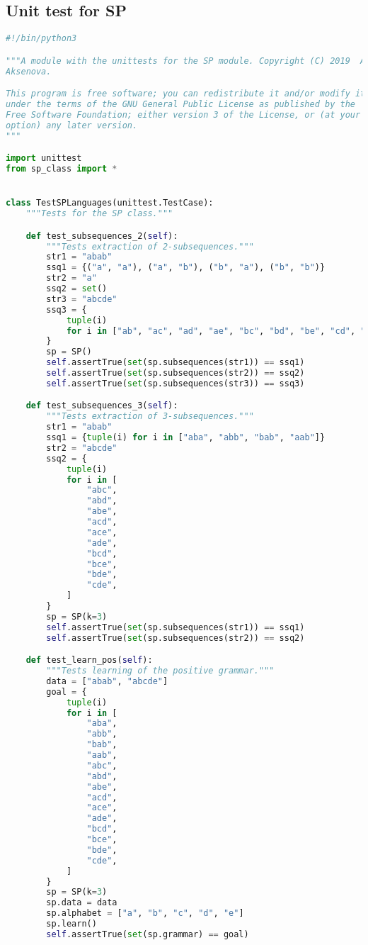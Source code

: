 \subsection*{Unit test for SP}

\begin{lstlisting}[language=Python]
#!/bin/python3

"""A module with the unittests for the SP module. Copyright (C) 2019  Alena
Aksenova.

This program is free software; you can redistribute it and/or modify it
under the terms of the GNU General Public License as published by the
Free Software Foundation; either version 3 of the License, or (at your
option) any later version.
"""

import unittest
from sp_class import *


class TestSPLanguages(unittest.TestCase):
    """Tests for the SP class."""

    def test_subsequences_2(self):
        """Tests extraction of 2-subsequences."""
        str1 = "abab"
        ssq1 = {("a", "a"), ("a", "b"), ("b", "a"), ("b", "b")}
        str2 = "a"
        ssq2 = set()
        str3 = "abcde"
        ssq3 = {
            tuple(i)
            for i in ["ab", "ac", "ad", "ae", "bc", "bd", "be", "cd", "ce", "de"]
        }
        sp = SP()
        self.assertTrue(set(sp.subsequences(str1)) == ssq1)
        self.assertTrue(set(sp.subsequences(str2)) == ssq2)
        self.assertTrue(set(sp.subsequences(str3)) == ssq3)

    def test_subsequences_3(self):
        """Tests extraction of 3-subsequences."""
        str1 = "abab"
        ssq1 = {tuple(i) for i in ["aba", "abb", "bab", "aab"]}
        str2 = "abcde"
        ssq2 = {
            tuple(i)
            for i in [
                "abc",
                "abd",
                "abe",
                "acd",
                "ace",
                "ade",
                "bcd",
                "bce",
                "bde",
                "cde",
            ]
        }
        sp = SP(k=3)
        self.assertTrue(set(sp.subsequences(str1)) == ssq1)
        self.assertTrue(set(sp.subsequences(str2)) == ssq2)

    def test_learn_pos(self):
        """Tests learning of the positive grammar."""
        data = ["abab", "abcde"]
        goal = {
            tuple(i)
            for i in [
                "aba",
                "abb",
                "bab",
                "aab",
                "abc",
                "abd",
                "abe",
                "acd",
                "ace",
                "ade",
                "bcd",
                "bce",
                "bde",
                "cde",
            ]
        }
        sp = SP(k=3)
        sp.data = data
        sp.alphabet = ["a", "b", "c", "d", "e"]
        sp.learn()
        self.assertTrue(set(sp.grammar) == goal)


\end{lstlisting}
